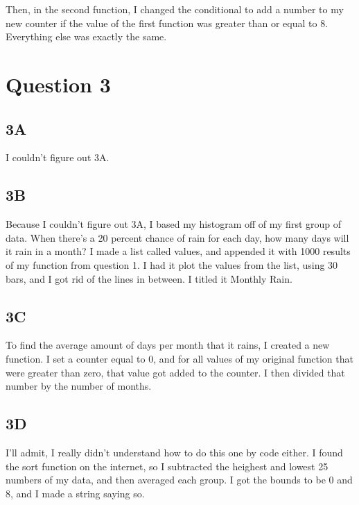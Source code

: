 \documentclass[twocolumn]{revtex4}
\begin{document}
Then, in the second function, I changed the conditional to add a number to my new counter if the value of the first function was greater than or equal to 8. Everything else was exactly the same.

\section{Question 3}
\subsection{3A}
I couldn't figure out 3A.

\subsection{3B}
Because I couldn't figure out 3A, I based my histogram off of my first group of data. When there's a 20 percent chance of rain for each day, how many days will it rain in a month? I made a list called values, and appended it with 1000 results of my function from question 1. I had it plot the values from the list, using 30 bars, and I got rid of the lines in between. I titled it Monthly Rain.

\subsection{3C}
To find the average amount of days per month that it rains, I created a new function. I set a counter equal to 0, and for all values of my original function that were greater than zero, that value got added to the counter. I then divided that number by the number of months.

\subsection{3D}
I'll admit, I really didn't understand how to do this one by code either. I found the sort function on the internet, so I subtracted the heighest and lowest 25 numbers of my data, and then averaged each group. I got the bounds to be 0 and 8, and I made a string saying so.



\end{document}

